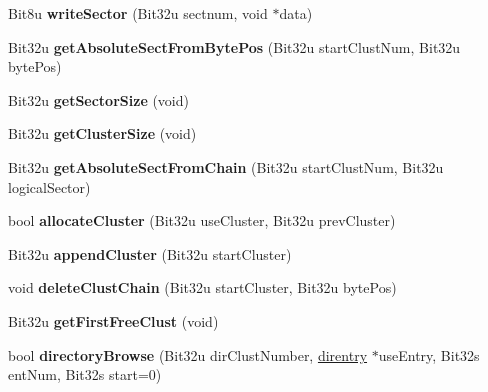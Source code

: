 \begin{DoxyCompactItemize}
\item 
\hypertarget{classfatDrive_a5c105a99ce90237b34f5a57a915042d7}{Bit8u {\bfseries write\-Sector} (Bit32u sectnum, void $\ast$data)}\label{classfatDrive_a5c105a99ce90237b34f5a57a915042d7}

\item 
\hypertarget{classfatDrive_ac865cd5b15f0a72a122783abdb9decbb}{Bit32u {\bfseries get\-Absolute\-Sect\-From\-Byte\-Pos} (Bit32u start\-Clust\-Num, Bit32u byte\-Pos)}\label{classfatDrive_ac865cd5b15f0a72a122783abdb9decbb}

\item 
\hypertarget{classfatDrive_ad2affae0064e689be43f4b081e8ae86b}{Bit32u {\bfseries get\-Sector\-Size} (void)}\label{classfatDrive_ad2affae0064e689be43f4b081e8ae86b}

\item 
\hypertarget{classfatDrive_ac9e9fc2d188b9e94e58366bf7a1a8be5}{Bit32u {\bfseries get\-Cluster\-Size} (void)}\label{classfatDrive_ac9e9fc2d188b9e94e58366bf7a1a8be5}

\item 
\hypertarget{classfatDrive_ab31954a5996df17bbd27e17f4fbc26d6}{Bit32u {\bfseries get\-Absolute\-Sect\-From\-Chain} (Bit32u start\-Clust\-Num, Bit32u logical\-Sector)}\label{classfatDrive_ab31954a5996df17bbd27e17f4fbc26d6}

\item 
\hypertarget{classfatDrive_a77ee4b8cfb4e4fa3f3f63315c827c5aa}{bool {\bfseries allocate\-Cluster} (Bit32u use\-Cluster, Bit32u prev\-Cluster)}\label{classfatDrive_a77ee4b8cfb4e4fa3f3f63315c827c5aa}

\item 
\hypertarget{classfatDrive_a06109e670f9aea5c4dd11d07c50ae240}{Bit32u {\bfseries append\-Cluster} (Bit32u start\-Cluster)}\label{classfatDrive_a06109e670f9aea5c4dd11d07c50ae240}

\item 
\hypertarget{classfatDrive_acdf76d8c0cefb8fa35d3bbbaea54c8e0}{void {\bfseries delete\-Clust\-Chain} (Bit32u start\-Cluster, Bit32u byte\-Pos)}\label{classfatDrive_acdf76d8c0cefb8fa35d3bbbaea54c8e0}

\item 
\hypertarget{classfatDrive_a629d48445667f2662cc360ccaef4b43e}{Bit32u {\bfseries get\-First\-Free\-Clust} (void)}\label{classfatDrive_a629d48445667f2662cc360ccaef4b43e}

\item 
\hypertarget{classfatDrive_accabf68f45861dba60d9c93981c816c4}{bool {\bfseries directory\-Browse} (Bit32u dir\-Clust\-Number, \hyperlink{structdirentry}{direntry} $\ast$use\-Entry, Bit32s ent\-Num, Bit32s start=0)}\label{classfatDrive_accabf68f45861dba60d9c93981c816c4}


\end{DoxyCompactItemize}
